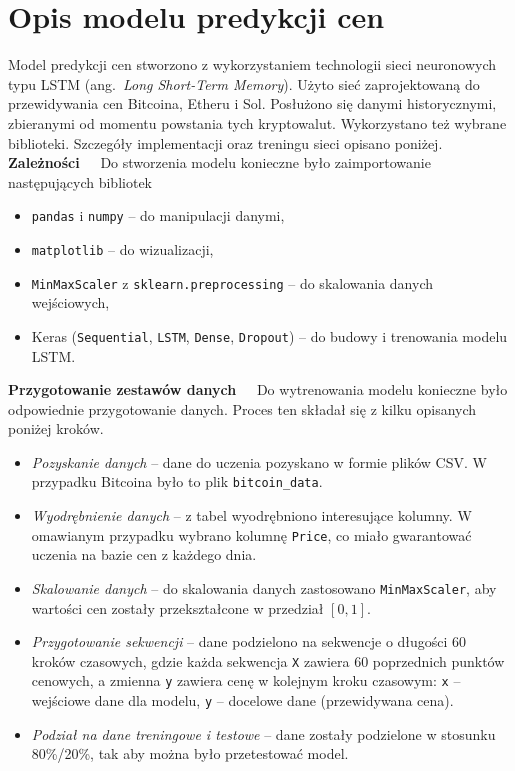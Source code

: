 \section{Opis modelu predykcji cen}
Model predykcji cen stworzono z wykorzystaniem technologii sieci neuronowych typu LSTM (ang.~\emph{Long Short-Term Memory}). Użyto sieć zaprojektowaną do przewidywania cen Bitcoina, Etheru i Sol. Posłużono się danymi historycznymi, zbieranymi od momentu powstania tych kryptowalut. Wykorzystano też wybrane biblioteki. Szczegóły implementacji oraz treningu sieci opisano poniżej.\\[-10pt]

\noindent \textbf{Zależności~~}
Do stworzenia modelu konieczne było zaimportowanie następujących bibliotek
\begin{itemize}
    \item \texttt{pandas} i \texttt{numpy} -- do manipulacji danymi,
    \item \texttt{matplotlib} -- do wizualizacji,
    \item \texttt{MinMaxScaler} z \texttt{sklearn.preprocessing} -- do skalowania danych wejściowych,
    \item Keras (\texttt{Sequential}, \texttt{LSTM}, \texttt{Dense}, \texttt{Dropout}) -- do budowy i trenowania modelu LSTM.
\end{itemize}

\noindent \textbf{Przygotowanie zestawów danych~~}
Do wytrenowania modelu konieczne było odpowiednie przygotowanie danych. Proces ten składał się z kilku opisanych poniżej kroków.
\begin{itemize}
\item \emph{Pozyskanie danych} -- dane do uczenia pozyskano w formie plików CSV. W przypadku Bitcoina było to plik \texttt{bitcoin\_data}.
\item \emph{Wyodrębnienie danych} -- z tabel wyodrębniono interesujące kolumny. W omawianym przypadku wybrano kolumnę \texttt{Price}, co miało gwarantować uczenia na bazie cen z każdego dnia.
\item \emph{Skalowanie danych} -- do skalowania danych zastosowano \texttt{MinMaxScaler}, aby wartości cen zostały przekształcone w przedział \([0, 1]\).
\item \emph{Przygotowanie sekwencji} -- dane podzielono na sekwencje o długości 60 kroków czasowych, gdzie każda sekwencja \texttt{X} zawiera 60 poprzednich punktów cenowych, a zmienna \texttt{y} zawiera cenę w kolejnym kroku czasowym:
\texttt{x} – wejściowe dane dla modelu,
 \texttt{y} – docelowe dane (przewidywana cena).
\item \emph{Podział na dane treningowe i testowe} -- dane zostały podzielone w stosunku 80\%/20\%, tak aby można było przetestować model.
\end{itemize}

